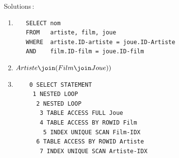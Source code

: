 
Solutions\,:
\begin{enumerate}
  \item 
   \begin{verbatim}
   SELECT nom 
   FROM   artiste, film, joue
   WHERE  artiste.ID-artiste = joue.ID-Artiste
   AND    film.ID-film = joue.ID-film
\end{verbatim}


   \item $Artiste \join (Film \join Joue))$
   \item
    \begin{verbatim}
    0 SELECT STATEMENT
     1 NESTED LOOP
      2 NESTED LOOP
       3 TABLE ACCESS FULL Joue
       4 TABLE ACCESS BY ROWID Film
        5 INDEX UNIQUE SCAN Film-IDX
      6 TABLE ACCESS BY ROWID Artiste
       7 INDEX UNIQUE SCAN Artiste-IDX
    \end{verbatim}
\end{enumerate}


